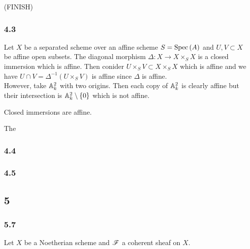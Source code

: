\documentclass[12pt]{article}
\begin{document}
(FINISH)

\subsubsection{4.3}

Let $X$ be a separated scheme over an affine scheme $S = \mathrm{Spec}\left( A \right)$ and $U, V \subset X$ be affine open subsets. The diagonal morphism $\Delta : X \to X \times_S X$ is a closed immersion which is affine. Then conider $U \times_S V \subset X \times_S X$ which is affine and we have $U \cap V = \Delta^{-1}(U \times_S V)$ is affine since $\Delta$ is affine.
\bigskip\\
However, take $\mathbb{A}^2_k$ with two origins. Then each copy of $\mathbb{A}^2_k$ is clearly affine but their intersection is $\mathbb{A}^2_k \setminus \{ 0 \}$ which is not affine. 

\begin{lemma}
Closed immersions are affine.
\end{lemma}

\begin{lemma}
The 
\end{lemma}

\subsubsection{4.4}

\subsubsection{4.5}

\subsection{5}

\subsubsection{5.7}

Let $X$ be a Noetherian scheme and $\mathscr{F}$ a coherent sheaf on $X$.
\end{document}

